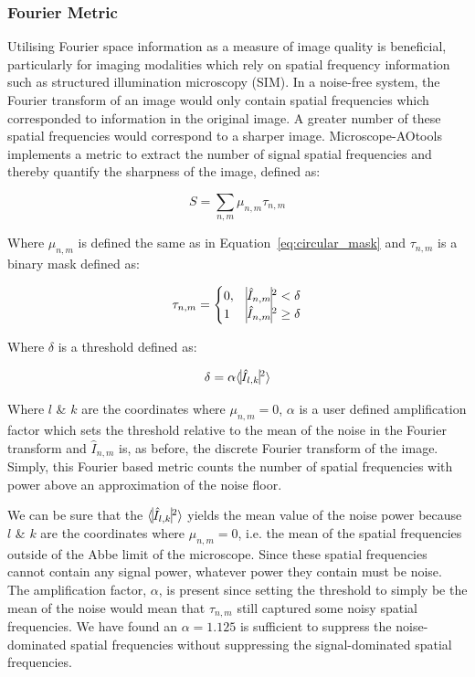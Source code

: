\subsubsection{Fourier Metric}

Utilising Fourier space information as a measure of image quality is beneficial, particularly for imaging modalities which rely on spatial frequency information such as structured illumination microscopy (SIM). In a noise-free system, the Fourier transform of an image would only contain spatial frequencies which corresponded to information in the original image. A greater number of these spatial frequencies would correspond to a sharper image. Microscope-AOtools implements a metric to extract the number of signal spatial frequencies and thereby quantify the sharpness of the image, defined as:

\begin{equation}\label{eq:Fourier_metric}
S = \sum\limits_{n,m}{\mu_{n,m}\tau_{n,m}}
\end{equation}

Where $\mu_{n,m}$ is defined the same as in Equation~\ref{eq:circular_mask} and $\tau_{n,m}$ is a binary mask defined as:

\begin{equation}\label{eq:noise_threshold_mask}
\tau_{n,m} = 
\begin{cases}
0, & \vline \hat{I}_{n,m} \vline^2 < \delta\\
1 & \vline \hat{I}_{n,m} \vline^2 \ge \delta\\ 
\end{cases}
\end{equation}

Where $\delta$ is a threshold defined as:

\begin{equation}\label{eq:noise_threshold}
\delta = \alpha\langle \vline \hat{I}_{l,k} \vline^2 \rangle
\end{equation}

Where $l$ \& $k$ are the coordinates where $\mu_{n,m} = 0$, $\alpha$ is a user defined amplification factor which sets the threshold relative to the mean of the noise in the Fourier transform and $\hat{I}_{n,m}$ is, as before, the discrete Fourier transform of the image. Simply, this Fourier based metric counts the number of spatial frequencies with power above an approximation of the noise floor. 

We can be sure that the $\langle \vline \hat{I}_{l,k} \vline^2 \rangle$ yields the mean value of the noise power because $l$ \& $k$ are the coordinates where $\mu_{n,m} = 0$, i.e. the mean of the spatial frequencies outside of the Abbe limit of the microscope. Since these spatial frequencies cannot contain any signal power, whatever power they contain must be noise. The amplification factor, $\alpha$, is present since setting the threshold to simply be the mean of the noise would mean that $\tau_{n,m}$ still captured some noisy spatial frequencies. We have found an $\alpha = 1.125$ is sufficient to suppress the noise-dominated spatial frequencies without suppressing the signal-dominated spatial frequencies. 

